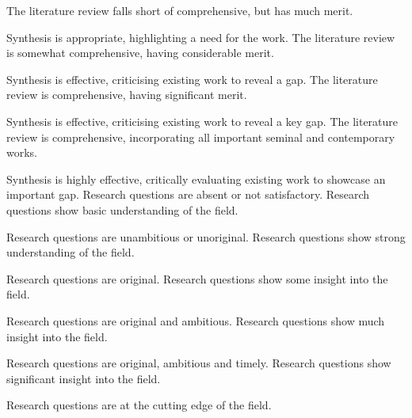 \begin{markingrubric}
        \grade The literature review falls short of comprehensive, but has much merit.
        	\par  Synthesis is appropriate, highlighting a need for the work.
        \grade The literature review is somewhat comprehensive, having considerable merit.
        	\par  Synthesis is effective, criticising existing work to reveal a gap.
        \grade The literature review is comprehensive, having significant merit.
        	\par Synthesis is effective, criticising existing work to reveal a key gap.
        \grade The literature review is comprehensive, incorporating all important seminal and contemporary works.
        	\par Synthesis is highly effective, critically evaluating existing work to showcase an important gap.
%
        \grade\fail 	Research questions are absent or not satisfactory.
        \grade 		Research questions show basic understanding of the field.
        \par		Research questions are unambitious or unoriginal.
        \grade 		Research questions show strong understanding of the field.
        \par		Research questions are original.
        \grade 		Research questions show some insight into the field.
        \par		Research questions are original and ambitious.
        \grade 		Research questions show much insight into the field.
        \par		Research questions are original, ambitious and timely.
        \grade 		Research questions show significant insight into the field.
        \par		Research questions are at the cutting edge of the field.
%
\end{markingrubric}

